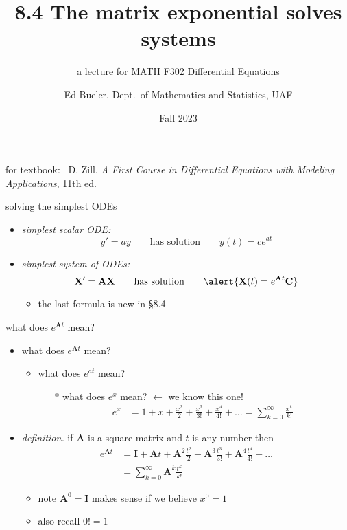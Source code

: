 \documentclass[dvipsnames,colorlinks]{beamer}
\title{8.4 The matrix exponential solves systems}
\subtitle{a lecture for MATH F302 Differential Equations}
\author{Ed Bueler, Dept.~of Mathematics and Statistics, UAF}
\date{Fall 2023}
\newcommand{\bA}{\mathbf{A}}
\newcommand{\bC}{\mathbf{C}}
\newcommand{\bI}{\mathbf{I}}
\newcommand{\bX}{\mathbf{X}}
\begin{document}


\begin{frame}
\titlepage

\centerline{\tiny for textbook: \, D. Zill, \emph{A First Course in Differential Equations with Modeling Applications}, 11th ed.}
\end{frame}


\begin{frame}{solving the simplest ODEs}

\begin{itemize}
\item \emph{simplest scalar ODE:}
    $$y'=ay \qquad \text{has solution} \qquad y(t) = c e^{at}$$

\bigskip
\item \emph{simplest system of ODEs:}
    $$\bX'=\bA \bX \qquad \text{has solution} \qquad \alert{\bX(t) = e^{\bA t}\bC}$$
    \begin{itemize}
    \item the last formula is \alert{new in \S8.4}
    \end{itemize}
\end{itemize}
\end{frame}


\begin{frame}{what does $e^{\bA t}$ mean?}

\begin{itemize}
\item what does $e^{\bA t}$ mean?
   \begin{itemize}
   \item what does $e^{at}$ mean?
       \begin{itemize}
       \item[$\ast$] what does $e^x$ mean?  \alert{$\longleftarrow$ we know this one!}
\begin{align*}
e^x &= 1 + x + \frac{x^2}{2} + \frac{x^3}{3!} + \frac{x^4}{4!} + \dots = \sum_{k=0}^\infty \frac{x^k}{k!}
\end{align*}
       \end{itemize}
   \end{itemize}

\medskip
\item \emph{definition.} if $\bA$ is a square matrix and $t$ is any number then
\begin{align*}
e^{\bA t} &= \bI + \bA t + \bA^2 \frac{t^2}{2} + \bA^3 \frac{t^3}{3!} + \bA^4 \frac{t^4}{4!} + \dots \\
    &= \sum_{k=0}^\infty \bA^k \frac{t^k}{k!}
\end{align*}
   \begin{itemize}
   \item note $\bA^0 = \bI$ makes sense if we believe $x^0=1$
   \item also recall $0!=1$
   \end{itemize}
\end{itemize}
\end{frame}
\end{document}
